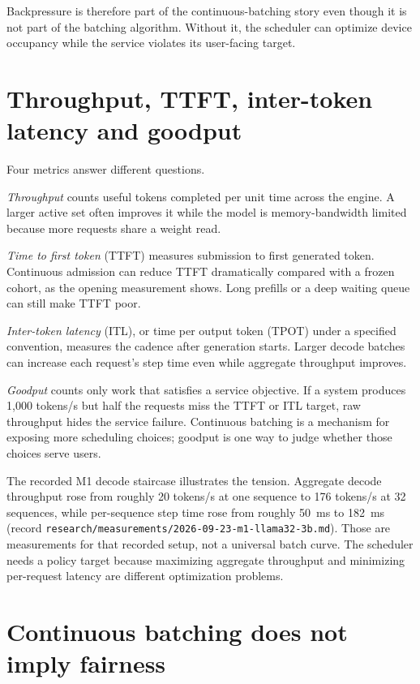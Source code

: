 Backpressure is therefore part of the continuous-batching story even though
it is not part of the batching algorithm. Without it, the scheduler can
optimize device occupancy while the service violates its user-facing target.

\section{Throughput, TTFT, inter-token latency and goodput}

Four metrics answer different questions.

\emph{Throughput} counts useful tokens completed per unit time across the
engine. A larger active set often improves it while the model is
memory-bandwidth limited because more requests share a weight read.

\emph{Time to first token} (TTFT) measures submission to first generated
token. Continuous admission can reduce TTFT dramatically compared with a
frozen cohort, as the opening measurement shows. Long prefills or a deep
waiting queue can still make TTFT poor.

\emph{Inter-token latency} (ITL), or time per output token (TPOT) under a
specified convention, measures the cadence after generation starts. Larger
decode batches can increase each request's step time even while aggregate
throughput improves.

\emph{Goodput} counts only work that satisfies a service objective. If a
system produces 1,000 tokens/s but half the requests miss the TTFT or ITL
target, raw throughput hides the service failure. Continuous batching is a
mechanism for exposing more scheduling choices; goodput is one way to judge
whether those choices serve users.

The recorded M1 decode staircase illustrates the tension. Aggregate decode
throughput rose from roughly 20 tokens/s at one sequence to 176 tokens/s at
32 sequences, while per-sequence step time rose from roughly 50~ms to 182~ms
(record \texttt{research/measurements/2026-09-23-m1-llama32-3b.md}).
Those are measurements for that recorded setup, not a universal batch curve.
The scheduler needs a policy target because maximizing aggregate throughput
and minimizing per-request latency are different optimization problems.

\section{Continuous batching does not imply fairness}

